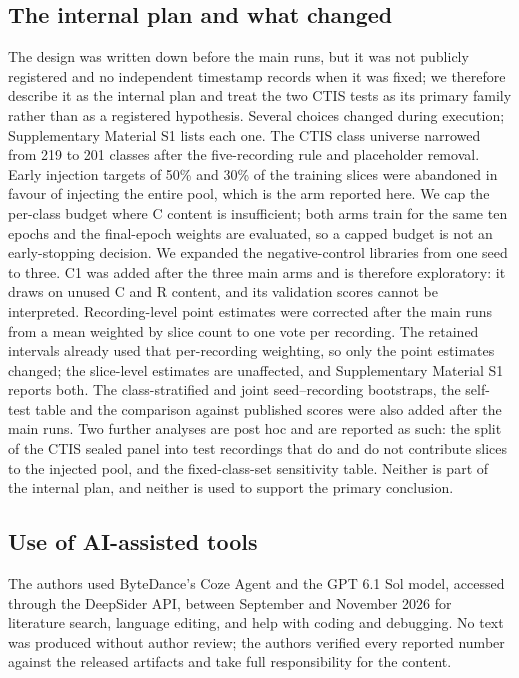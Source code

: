 \subsection{The internal plan and what changed}

The design was written down before the main runs, but it was not publicly registered and no
independent timestamp records when it was fixed; we therefore describe it as the internal plan and
treat the two CTIS tests as its primary family rather than as a registered hypothesis. Several
choices changed during execution; Supplementary Material S1 lists each one. The CTIS class
universe narrowed from 219 to 201 classes after the five-recording rule and placeholder removal.
Early injection targets of 50\% and 30\% of the training slices were abandoned in favour of
injecting the entire pool, which is the arm reported here. We cap the per-class budget where C
content is insufficient; both arms train for the same ten epochs and the final-epoch weights are
evaluated, so a capped budget is not an early-stopping decision. We expanded the negative-control
libraries from one seed to three. C1 was added after the three main arms and is therefore
exploratory: it draws on unused C and R content, and its validation scores cannot be interpreted.
Recording-level point estimates were corrected after the main runs from a mean weighted by slice
count to one vote per recording. The retained intervals already used that per-recording
weighting, so only the point estimates changed; the slice-level estimates are unaffected, and
Supplementary Material S1 reports both. The class-stratified and joint seed--recording bootstraps, the self-test table and
the comparison against published scores were also added after the main runs. Two further analyses are
post hoc and are reported as such: the split of the CTIS sealed panel into test recordings that do
and do not contribute slices to the injected pool, and the fixed-class-set sensitivity table. Neither
is part of the internal plan, and neither is used to support the primary conclusion.

\subsection{Use of AI-assisted tools}

The authors used ByteDance's Coze Agent and the GPT 6.1 Sol model, accessed through the DeepSider
API, between September and November 2026 for literature search, language editing, and help with
coding and debugging. No text was produced without author review; the authors verified every
reported number against the released artifacts and take full responsibility for the content.
